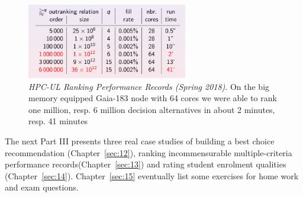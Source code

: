 \begin{figure}[ht]
\sidecaption[t]
\includegraphics[width=7cm]{Figures/11-2-rankingRecords.png}
\caption[HPC-UL Ranking Performance Records (Spring 2018)]{\emph{HPC-UL Ranking Performance Records (Spring 2018)}. On the big memory equipped Gaia-183 node with 64 cores we were able to rank one million, resp. 6 million decision alternatives in about 2 minutes, resp. 41 minutes}
\label{fig:11.2}       %
\end{figure}

\vspace{\baselineskip}
The next Part III presents three real case studies of building a best choice recommendation (Chapter~\ref{sec:12}), ranking incommensurable multiple-criteria performance records(Chapter~\ref{sec:13}) and rating student enrolment qualities (Chapter~\ref{sec:14}). Chapter~\ref{sec:15} eventually list some exercises for home work and exam questions.
%


